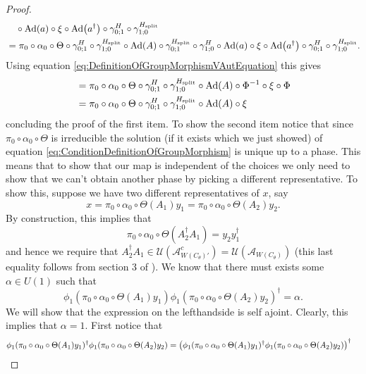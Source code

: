 \documentclass[12pt,a4paper,twoside]{article}
\let\originalleft\left
\let\originalright\right
\renewcommand{\left}{\mathopen{}\mathclose\bgroup\originalleft}
\renewcommand{\right}{\aftergroup\egroup\originalright}
\newcommand{\UU}{\mathcal U}
\renewcommand{\AA}{\mathcal A}
\newcommand{\Ad}[1]{\textrm{Ad}\left(#1\right)}
\theoremstyle{definition}
\numberwithin{equation}{section}
\begin{document}
\begin{proof}
\begin{align}
		\nonumber
		&\quad\circ\Ad{a}\circ\xi\circ\Ad{a^\dagger}\circ\gamma^H_{0;1}\circ\gamma^{H_\text{split}}_{1;0}\\
		&=\pi_0\circ\alpha_0\circ\Theta\circ\gamma^H_{0;1}\circ\gamma^{H_\text{split}}_{1;0}\circ\Ad{A}\circ\gamma^{H_\text{split}}_{0;1}\circ\gamma^H_{1;0}\circ\Ad{a}\circ\xi\circ\Ad{a^\dagger}\circ\gamma^H_{0;1}\circ\gamma^{H_\text{split}}_{1;0}.
	\end{align}
	Using equation \eqref{eq:DefinitionOfGroupMorphismVAutEquation} this gives
	\begin{align}
		&=\pi_0\circ\alpha_0\circ\Theta\circ\gamma^H_{0;1}\circ\gamma^{H_\text{split}}_{1;0}\circ\Ad{A}\circ\Phi^{-1}\circ\xi\circ\Phi\\
		&=\pi_0\circ\alpha_0\circ\Theta\circ\gamma^H_{0;1}\circ\gamma^{H_\text{split}}_{1;0}\circ\Ad{A}\circ\xi
	\end{align}
	concluding the proof of the first item. To show the second item notice that since $\pi_0\circ\alpha_0\circ\Theta$ is irreducible the solution (if it exists which we just showed) of equation \eqref{eq:ConditionDefinitionOfGroupMorphism} is unique up to a phase. This means that to show that our map is independent of the choices we only need to show that we can't obtain another phase by picking a different representative. To show this, suppose we have two different representatives of $x$, say
\begin{equation}
	x=\pi_0\circ\alpha_0\circ\Theta(A_1)y_1=\pi_0\circ\alpha_0\circ\Theta(A_2)y_2.
\end{equation}
By construction, this implies that
\begin{equation}\label{eq:ProofThatphi1IsIndependentOfChoiceOfRepresentative}
	\pi_0\circ\alpha_0\circ\Theta(A_2^\dagger A_1)=y_2 y_1^\dagger
\end{equation}
and hence we require that $A_2^\dagger A_1\in\UU(\AA_{W(C_\theta)'}^c)=\UU(\AA_{W(C_\theta)})$ (this last equality follows from section 3 of \cite{NaScWe_2013}). We know that there must exists some $\alpha\in U(1)$ such that
\begin{equation}
	\phi_1(\pi_0\circ\alpha_0\circ\Theta(A_1)y_1)\phi_1(\pi_0\circ\alpha_0\circ\Theta(A_2)y_2)^\dagger=\alpha.
\end{equation}
We will show that the expression on the lefthandside is self ajoint. Clearly, this implies that $\alpha=1$. First notice that
\begin{align}
	\phi_1(\pi_0\circ\alpha_0\circ\Theta(A_1)y_1)^\dagger \phi_1(\pi_0\circ\alpha_0\circ\Theta(A_2)y_2)&=\left(\phi_1(\pi_0\circ\alpha_0\circ\Theta(A_1)y_1)^\dagger\phi_1(\pi_0\circ\alpha_0\circ\Theta(A_2)y_2)\right)^\dagger

\end{align}
\end{proof}
\end{document}
